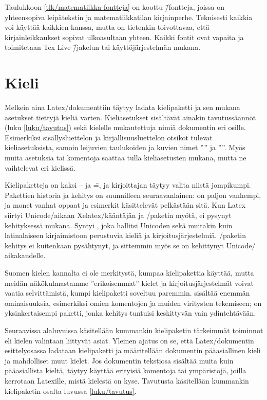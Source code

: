 \noindent
Taulukkoon \ref{tlk/matematiikka-fontteja} on koottu  \=/fontteja, joissa on yhteensopiva leipätekstin ja
matematiikkatilan kirjainperhe. Teknisesti kaikkia voi käyttää kaikkien
kanssa, mutta on tietenkin toivottavaa, että kirjainleikkaukset sopivat
ulkoasultaan yhteen. Kaikki fontit ovat vapaita ja toimitetaan Tex Live
\=/jakelun tai käyttöjärjestelmän mukana.

\section{Kieli}
\label{luku/kieliasetukset}

Melkein aina Latex\-/dokumenttiin täytyy ladata kielipaketti ja sen
mukana asetukset tiettyjä kieliä varten. Kieliasetukset sisältävät
ainakin tavutussäännöt (luku \ref{luku/tavutus}) sekä kielelle
mukautettuja nimiä dokumentin eri osille. Esimerkiksi sisällysluettelon
ja kirjallisuusluettelon otsikot tulevat kieliasetuksista, samoin
leijuvien taulukoiden ja kuvien nimet ''\tablename'' ja ''\figurename''.
Myös muita asetuksia tai komentoja saattaa tulla kieliasetusten mukana,
mutta ne vaihtelevat eri kielissä.

Kielipaketteja on kaksi --  ja  \==,
ja kirjoittajan täytyy valita niistä jompikumpi. Pakettien historia ja
kehitys on suunnilleen seuraavanlainen:  on paljon
vanhempi, ja monet vanhat oppaat ja esimerkit käsittelevät pelkästään
sitä. Kun Latex siirtyi Unicode\-/aikaan Xelatex\-/kääntäjän ja
\-/paketin myötä,  ei pysynyt
kehityksessä mukana. Syntyi , joka hallitsi
Unicoden sekä muitakin kuin latinalaiseen kirjaimistoon perustuvia
kieliä ja kirjoitusjärjestelmiä. \-/paketin kehitys ei
kuitenkaan pysähtynyt, ja sittemmin myös se on kehittynyt Unicode\-/
aikakaudelle.

Suomen kielen kannalta ei ole merkitystä, kumpaa kielipakettia käyttää,
mutta meidän näkökulmastamme ''erikoisemmat'' kielet ja
kirjoitusjärjestelmät voivat vaatia selvittämistä, kumpi kielipaketti
soveltuu paremmin.  sisältää enemmän ominaisuuksia,
esimerkiksi omien komentojen ja muiden viritysten tekemiseen;
 on yksinkertaisempi paketti, jonka kehitys
tuntuisi keskittyvän vain ydintehtävään.

Seuraavissa alaluvuissa käsitellään kummankin kielipaketin tärkeimmät
toiminnot eli kielen valintaan liittyvät asiat. Yleinen ajatus on se,
että Latex\-/dokumentin esittelyosassa ladataan kielipaketti ja
määritellään dokumentin pääasiallinen kieli ja mahdolliset muut kielet.
Jos dokumentin tekstiosa sisältää muita kuin pääasiallista kieltä,
täytyy käyttää erityisiä komentoja tai ympäristöjä, joilla kerrotaan
Latexille, mistä kielestä on kyse. Tavutusta käsitellään kummankin
kielipaketin osalta luvussa \ref{luku/tavutus}.

